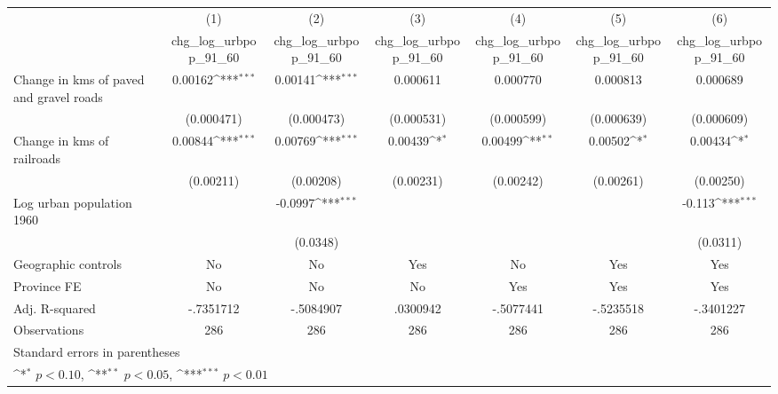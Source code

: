 {
\def\sym#1{\ifmmode^{#1}\else\(^{#1}\)\fi}
\begin{tabular}{l*{6}{c}}
\hline\hline
                    &\multicolumn{1}{c}{(1)}&\multicolumn{1}{c}{(2)}&\multicolumn{1}{c}{(3)}&\multicolumn{1}{c}{(4)}&\multicolumn{1}{c}{(5)}&\multicolumn{1}{c}{(6)}\\
                    &\multicolumn{1}{c}{chg\_log\_urbpop\_91\_60}&\multicolumn{1}{c}{chg\_log\_urbpop\_91\_60}&\multicolumn{1}{c}{chg\_log\_urbpop\_91\_60}&\multicolumn{1}{c}{chg\_log\_urbpop\_91\_60}&\multicolumn{1}{c}{chg\_log\_urbpop\_91\_60}&\multicolumn{1}{c}{chg\_log\_urbpop\_91\_60}\\
\hline
Change in kms of paved and gravel roads&     0.00162\sym{***}&     0.00141\sym{***}&    0.000611         &    0.000770         &    0.000813         &    0.000689         \\
                    &  (0.000471)         &  (0.000473)         &  (0.000531)         &  (0.000599)         &  (0.000639)         &  (0.000609)         \\
[1em]
Change in kms of railroads&     0.00844\sym{***}&     0.00769\sym{***}&     0.00439\sym{*}  &     0.00499\sym{**} &     0.00502\sym{*}  &     0.00434\sym{*}  \\
                    &   (0.00211)         &   (0.00208)         &   (0.00231)         &   (0.00242)         &   (0.00261)         &   (0.00250)         \\
[1em]
Log urban population 1960&                     &     -0.0997\sym{***}&                     &                     &                     &      -0.113\sym{***}\\
                    &                     &    (0.0348)         &                     &                     &                     &    (0.0311)         \\
\hline
Geographic controls &          No         &          No         &         Yes         &          No         &         Yes         &         Yes         \\
Province FE         &          No         &          No         &          No         &         Yes         &         Yes         &         Yes         \\
Adj. R-squared      &   -.7351712         &   -.5084907         &    .0300942         &   -.5077441         &   -.5235518         &   -.3401227         \\
Observations        &         286         &         286         &         286         &         286         &         286         &         286         \\
\hline\hline
\multicolumn{7}{l}{\footnotesize Standard errors in parentheses}\\
\multicolumn{7}{l}{\footnotesize \sym{*} \(p<0.10\), \sym{**} \(p<0.05\), \sym{***} \(p<0.01\)}\\
\end{tabular}
}
